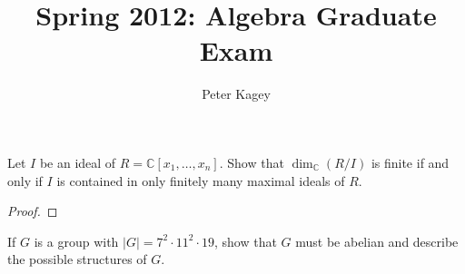 \documentclass{article}
\newenvironment{problem}[2][Problem]{\begin{trivlist}
\item[\hskip \labelsep {\bfseries #1}\hskip \labelsep {\bfseries #2.}]}{\end{trivlist}}
\newcommand{\C}{\mathbb C}
\begin{document}
\title{Spring 2012: Algebra Graduate Exam}
\author{Peter Kagey}

\maketitle

\begin{problem}{1}
  Let $I$ be an ideal of $R = \C[x_1, \hdots, x_n]$. Show that $\dim_\C(R/I)$ is finite if and only if $I$ is contained in only finitely many maximal ideals of $R$.
\end{problem}

\begin{proof}
\end{proof}
\pagebreak

\begin{problem}{2}
  If $G$ is a group with $|G| = 7^2 \cdot 11^2 \cdot 19$, show that $G$ must be
  abelian and describe the possible structures of $G$.
\end{problem}
\end{document}

